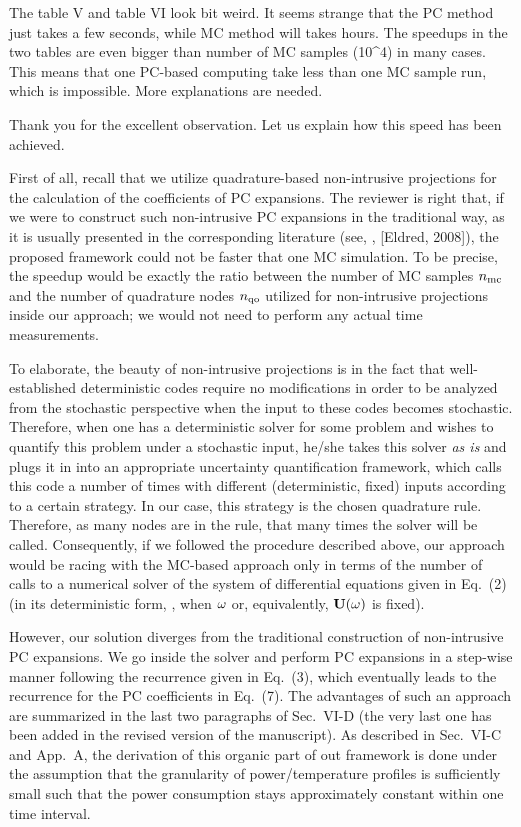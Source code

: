 \begin{reviewer}
[Comment 10] The table V and table VI look  bit weird.  It seems strange that the PC method just takes a few seconds, while MC method will takes hours. The speedups in the two tables  are even bigger than number of MC samples (10\^{}4) in many cases. This means that one PC-based computing take less than one MC sample run, which is impossible.  More explanations are needed.
\end{reviewer}
\begin{authors}
Thank you for the excellent observation.
Let us explain how this speed has been achieved.

First of all, recall that we utilize quadrature-based non-intrusive projections for the calculation of the coefficients of PC expansions.
The reviewer is right that, if we were to construct such non-intrusive PC expansions in the traditional way, as it is usually presented in the corresponding literature (see, \eg, [Eldred, 2008]), the proposed framework could not be faster that one MC simulation.
To be precise, the speedup would be exactly the ratio between the number of MC samples ${n_\text{mc}}$ and the number of quadrature nodes ${n_\text{qo}}$ utilized for non-intrusive projections inside our approach; we would not need to perform any actual time measurements.

To elaborate, the beauty of non-intrusive projections is in the fact that well-established deterministic codes require no modifications in order to be analyzed from the stochastic perspective when the input to these codes becomes stochastic.
Therefore, when one has a deterministic solver for some problem and wishes to quantify this problem under a stochastic input, he/she takes this solver \emph{as is} and plugs it in into an appropriate uncertainty quantification framework, which calls this code a number of times with different (deterministic, fixed) inputs according to a certain strategy.
In our case, this strategy is the chosen quadrature rule.
Therefore, as many nodes are in the rule, that many times the solver will be called.
Consequently, if we followed the procedure described above, our approach would be racing with the MC-based approach only in terms of the number of calls to a numerical solver of the system of differential equations given in Eq.~(2) (in its deterministic form, \ie, when $\omega$ or, equivalently, $\mathbf{U}(\omega)$ is fixed).

However, our solution diverges from the traditional construction of non-intrusive PC expansions.
We go inside the solver and perform PC expansions in a step-wise manner following the recurrence given in Eq.~(3), which eventually leads to the recurrence for the PC coefficients in Eq.~(7).
The advantages of such an approach are summarized in the last two paragraphs of Sec.~VI-D (the very last one has been added in the revised version of the manuscript).
As described in Sec.~VI-C and App.~A, the derivation of this organic part of out framework is done under the assumption that the granularity of power/temperature profiles is sufficiently small such that the power consumption stays approximately constant within one time interval.


\end{authors}
